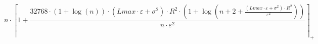 \[n \cdot \left\lceil 1 + \frac{32768 \cdot \left(1 + \log\left(n\right)\right) \cdot \left(Lmax \cdot \varepsilon + \sigma^{2}\right) \cdot R^{2} \cdot \left(1 + \log\left(n + 2 + \frac{\left(Lmax \cdot \varepsilon + \sigma^{2}\right) \cdot R^{2}}{\varepsilon^{2}}\right)\right)}{n \cdot \varepsilon^{2}} \right\rceil_{+}\]
